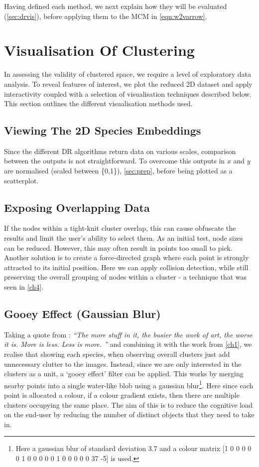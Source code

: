 Having defined each method, we next explain how they will be evaluated (\autoref{sec:drvis}), before applying them to the MCM in \autoref{eqn:w2varrow}.




\section{Visualisation Of Clustering}\label{sec:drvis}

In assessing the validity of clustered space, we require a level of exploratory data analysis. To reveal features of interest, we plot the reduced 2D dataset and apply interactivity coupled with a selection of visualisation techniques described below. This section outlines the different visualisation methods used.

\subsection{Viewing The 2D Species Embeddings}
Since the different DR algorithms return data on various scales, comparison between the outputs is not straightforward. To overcome this outputs in $x$ and $y$ are normalised (scaled between \{0,1\}), \autoref{sec:prep}, before being plotted as a scatterplot.


\subsection{Exposing Overlapping Data}
If the nodes within a tight-knit cluster overlap, this can cause obfuscate the results and limit the user's ability to select them. As an initial test, node sizes can be reduced. However, this may often result in points too small to pick. Another solution is to create a force-directed graph where each point is strongly attracted to its initial position. Here we can apply collision detection, while still preserving the overall grouping of nodes within a cluster - a technique that was seen in \autoref{ch4}.


\subsection{Gooey Effect (Gaussian Blur)}
Taking a quote from \cite{lessmore}:
\emph{``The more stuff in it, the busier the work of art, the worse it is. More is less. Less is more. %
''} and combining it with the work from \autoref{ch1}, we realise that showing each species, when observing overall clusters just add unnecessary clutter to the images. Instead, since we are only interested in the clusters as a unit, a `gooey effect' filter can be applied. This works by merging nearby points into a single water-like blob using a gaussian blur\footnote{Here a gaussian blur of standard deviation 3.7 and a colour matrix [1 0 0 0 0  0 1 0 0 0  0 0 1 0 0  0 0 0 37 -5] is used.}. Here since each point is allocated a colour, if a colour gradient exists, then there are multiple clusters occupying the same place. The aim of this is to reduce the cognitive load on the end-user by reducing the number of distinct objects that they need to take in.



